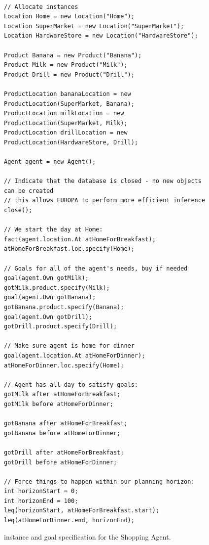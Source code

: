 \begin{figure}[h!]
\begin{verbatim}

// Allocate instances
Location Home = new Location("Home");
Location SuperMarket = new Location("SuperMarket");
Location HardwareStore = new Location("HardwareStore");

Product Banana = new Product("Banana");
Product Milk = new Product("Milk");
Product Drill = new Product("Drill");

ProductLocation bananaLocation = new ProductLocation(SuperMarket, Banana);
ProductLocation milkLocation = new ProductLocation(SuperMarket, Milk);
ProductLocation drillLocation = new ProductLocation(HardwareStore, Drill);

Agent agent = new Agent();

// Indicate that the database is closed - no new objects can be created
// this allows EUROPA to perform more efficient inference
close();

// We start the day at Home:
fact(agent.location.At atHomeForBreakfast);
atHomeForBreakfast.loc.specify(Home);

// Goals for all of the agent's needs, buy if needed
goal(agent.Own gotMilk);
gotMilk.product.specify(Milk);
goal(agent.Own gotBanana);
gotBanana.product.specify(Banana);
goal(agent.Own gotDrill);
gotDrill.product.specify(Drill);

// Make sure agent is home for dinner
goal(agent.location.At atHomeForDinner);
atHomeForDinner.loc.specify(Home);

// Agent has all day to satisfy goals:
gotMilk after atHomeForBreakfast;
gotMilk before atHomeForDinner;

gotBanana after atHomeForBreakfast;
gotBanana before atHomeForDinner;

gotDrill after atHomeForBreakfast;
gotDrill before atHomeForDinner;

// Force things to happen within our planning horizon:
int horizonStart = 0;
int horizonEnd = 100;
leq(horizonStart, atHomeForBreakfast.start);
leq(atHomeForDinner.end, horizonEnd);

\end{verbatim}
\caption{\small \nd instance and goal specification for the Shopping Agent.}
\label{fig:nddlshop-instance}
\end{figure}


